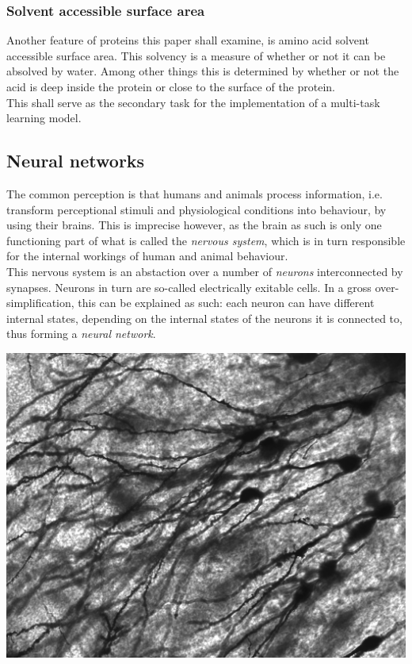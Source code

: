 \subsubsection{Solvent accessible surface area}
Another feature of proteins this paper shall examine, is amino acid solvent accessible surface area. This solvency is a measure of whether or not it can be absolved by water. Among other things this is determined by whether or not the acid is deep inside the protein or close to the surface of the protein. \\
This shall serve as the secondary task for the implementation of a multi-task learning model.

\subsection{Neural networks}
The common perception is that humans and animals process information, i.e. transform perceptional 
stimuli and physiological conditions into behaviour, by using their brains. This is imprecise 
however, as the brain as such is only one functioning part of what is called the \textit{nervous 
system}, which is in turn responsible for the internal workings of human and animal behaviour.\\
This nervous system is an abstaction over a number of \textit{neurons} interconnected by 
synapses. Neurons in turn are so-called electrically exitable cells. In a gross over-simplification, this can be explained as such: each neuron can have different internal states, depending on the internal states of the neurons it is connected to, thus forming a \textit{neural network}.


\begin{Figure}
 \centering
 \includegraphics[width=0.8\linewidth]{images/Gyrus_Dentatus_40x}
 \captionsetup{width=0.8\linewidth, font=small}
\end{Figure}

